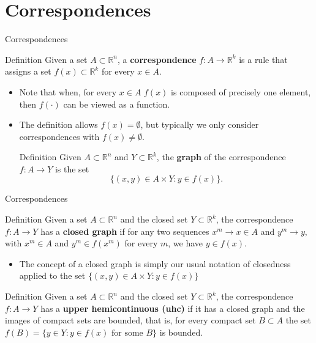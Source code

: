 \documentclass{beamer}
\begin{document}
\section{Correspondences}
\begin{frame}{Correspondences}
\begin{block}{Definition}
    Given a set $A\subset \mathbb{R}^n$, a \textbf{correspondence }$f:A\to \mathbb{R}^k$ is a rule that assigns a set $f(x)\subset \mathbb{R}^k$ for every $x\in A$. 
\end{block}
    \begin{itemize}
        \item Note that when, for every $x\in A$ $f(x)$ is composed of precisely one element, then $f(\cdot)$ can be viewed as a function. 
        \item The definition allows $f(x)=\emptyset$, but typically we only consider correspondences with $f(x)\neq \emptyset$. 
        \begin{block}{Definition}
            Given $A\subset \mathbb{R}^n$ and $Y\subset \mathbb{R}^k$, the \textbf{graph} of the correspondence $f:A\to Y$ is the set
            \[\{(x,y)\in A\times Y: y\in f(x)\}.
            \]
        \end{block}
    \end{itemize}
\end{frame}
\begin{frame}{Correspondences}
\begin{block}{Definition}
Given a set $A\subset \mathbb{R}^n$ and  the closed set $Y\subset \mathbb{R}^k$, the correspondence $f:A\to Y$ has a \textbf{closed graph} if for any two sequences $x^m\to x \in A$ and $y^m\to y, $ with $x^m\in A$ and $y^m\in f(x^m)$ for every $m$, we have $y\in f(x)$. 
\end{block}
\begin{itemize}
    \item The concept of a closed graph is simply our usual notation of closedness applied to the set $\{(x,y)\in A\times Y: y\in f(x)\}$
\end{itemize}
\begin{block}{Definition}
Given a set $A\subset \mathbb{R}^n$ and  the closed set $Y\subset \mathbb{R}^k$, the correspondence $f:A\to Y$ has a \textbf{upper hemicontinuous (uhc)} if it has a closed graph and the images of compact sets are bounded, that is, for every compact set $B\subset A$ the set $f(B)=\{y\in Y: y\in f(x) \text{ for some } B\}$ is bounded. 
\end{block}
\end{frame}
\end{document}
